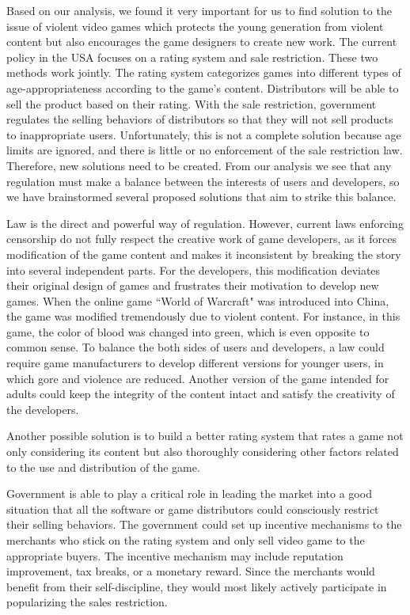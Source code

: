 \indent\indent Based on our analysis, we found it very important for us to find solution to the issue of violent video games which protects the young generation from violent content but also encourages the game designers to create new work. The current policy in the USA focuses on a rating system and sale restriction. These two methods work jointly. The rating system categorizes games into different types of age-appropriateness according to the game's content. Distributors will be able to sell the product based on their rating. With the sale restriction, government regulates the selling behaviors of distributors so that they will not sell products to inappropriate users. Unfortunately, this is not a complete solution because age limits are ignored, and there is little or no enforcement of the sale restriction law. Therefore, new solutions need to be created. From our analysis we see that any regulation must make a balance between the interests of users and developers, so we have brainstormed several proposed solutions that aim to strike this balance. 

Law is the direct and powerful way of regulation. However, current laws enforcing censorship do not fully respect the creative work of game developers, as it forces modification of the game content and makes it inconsistent by breaking the story into several independent parts. For the developers, this modification deviates their original design of games and frustrates their motivation to develop new games. When the online game ``World of Warcraft" was introduced into China, the game was modified tremendously due to violent content. For instance, in this game, the color of blood was changed into green, which is even opposite to common sense. To balance the both sides of users and developers, a law could require game manufacturers to develop different versions for younger users, in which gore and violence are reduced. Another version of the game intended for adults could keep the integrity of the content intact and satisfy the creativity of the developers. 

Another possible solution is to build a better rating system that rates a game not only considering its content but also thoroughly considering other factors related to the use and distribution of the game. 

Government is able to play a critical role in leading the market into a good situation that all the software or game distributors could consciously restrict their selling behaviors. The government could set up incentive mechanisms to the merchants who stick on the rating system and only sell video game to the appropriate buyers. The incentive mechanism may include reputation improvement, tax breaks, or a monetary reward. Since the merchants would benefit from their self-discipline, they would most likely actively participate in popularizing the sales restriction.

